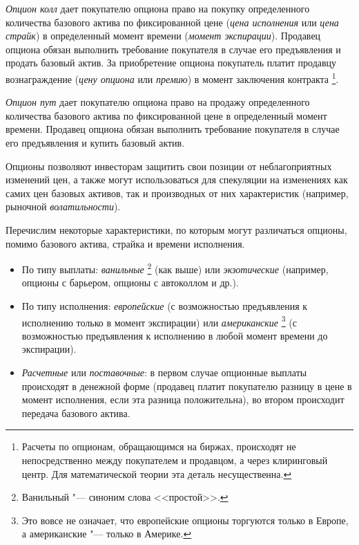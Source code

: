 \emph{Опцион колл} дает покупателю опциона право на покупку определенного количества базового актива по фиксированной цене (\emph{цена исполнения} или \emph{цена страйк}) в определенный момент времени (\emph{момент экспирации}).
Продавец опциона обязан выполнить требование покупателя в случае его предъявления и продать базовый актив.
За приобретение опциона покупатель платит продавцу вознаграждение (\emph{цену опциона} или \emph{премию}) в момент заключения контракта%
\footnote{Расчеты по опционам, обращающимся на биржах, происходят не непосредственно между покупателем и продавцом, а через клиринговый центр.
Для математической теории эта деталь несущественна.}.

\emph{Опцион пут} дает покупателю опциона право на продажу определенного количества базового актива по фиксированной цене в определенный момент времени.
Продавец опциона обязан выполнить требование покупателя в случае его предъявления и купить базовый актив. 

Опционы позволяют инвесторам защитить свои позиции от неблагоприятных изменений цен, а также могут использоваться для спекуляции на изменениях как самих цен базовых активов, так и производных от них характеристик (например, рыночной \emph{волатильности}).

Перечислим некоторые характеристики, по которым могут различаться опционы, помимо базового актива, страйка и времени исполнения. 
\begin{itemize}
\item По типу выплаты: \emph{ванильные}%
\footnote{Ванильный "--- синоним слова <<простой>>.}
(как выше) или \emph{экзотические} (например, опционы с барьером, опционы с автоколлом и др.).

\item По типу исполнения: \emph{европейские} (с возможностью предъявления к исполнению только в момент экспирации) или \emph{американские}%
\footnote{Это вовсе не означает, что европейские опционы торгуются только в Европе, а американские "--- только в Америке.}
(с возможностью предъявления к исполнению в любой момент времени до экспирации).

\item \emph{Расчетные} или \emph{поставочные}: в первом случае опционные выплаты происходят в денежной форме (продавец платит покупателю разницу в цене в момент исполнения, если эта разница положительна), во втором происходит передача базового актива.

\end{itemize}

